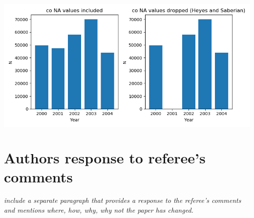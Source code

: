 \documentclass[11pt]{article}
\begin{document}
\begin{subappendices}
		\begin{center}
		 \label{tab:title} 
		{
		\includegraphics[scale=0.85]{double_plot_year_dist_with_and_whithout_co.png}	
		}
		\end{center}		
		
		
	\end{subappendices}	
	
	
	\newpage
	\section{Authors response to referee's comments}
			\textit{include a separate paragraph that provides a response to the referee's comments and mentions where, how, why, why not the paper has changed.}
	\newpage
	{\footnotesize 
		
		\singlespacing
		
	}
	
	
\end{document}
